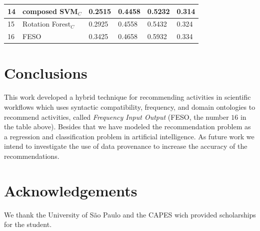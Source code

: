 \documentclass[ a0, portrait]{a0poster}
\begin{document}
\begin{multicols}{2}
\begin{tabular}{|l|l|l|l|l|l|}
14    & composed SVM\(_C\)     & 0.2515                        & 0.4458                         & 0.5232                          & 0.314            \\ \hline
15    & Rotation Forest\(_C\)      & 0.2925                        & 0.4558                        & 0.5432                          & 0.324            \\ \hline
16    & FESO                                & 0.3425                        & 0.4658                        & 0.5932                          & 0.334            \\ \hline

\end{tabular}
\vspace{1cm}

\color{Navy} %

\section*{Conclusions}

This work developed a hybrid technique for recommending activities in scientific workflows which uses syntactic compatibility, frequency, and domain ontologies to recommend activities, called \emph{Frequency Input Output} (FESO, the number $16$ in the table above). Besides that we have modeled the recommendation problem as a regression and classification problem in artificial intelligence. As future work we intend to investigate the use of data provenance to increase the accuracy of the recommendations.


\section*{Acknowledgements}

We thank the University of São Paulo and the CAPES wich provided scholarships for the student. 


\end{multicols}
\end{document}
